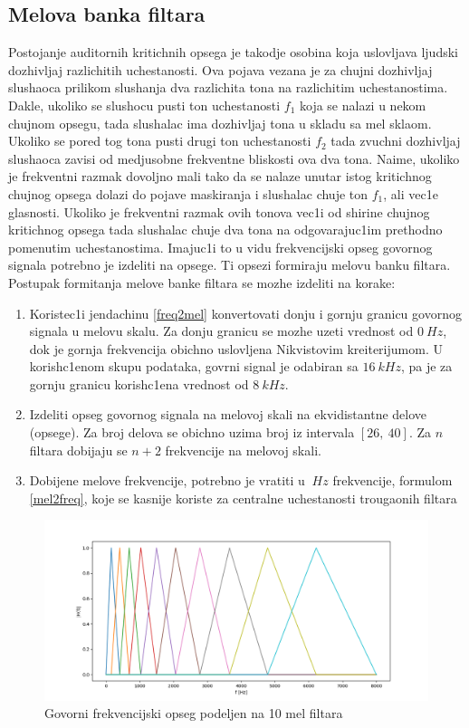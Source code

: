 \documentclass[a4paper, openany, oneside, 11pt]{book}
\begin{document}
\subsection{Melova banka filtara}
Postojanje auditornih kritichnih opsega je takodje osobina koja uslovljava ljudski dozhivljaj razlichitih uchestanosti. Ova pojava vezana je za chujni dozhivljaj slushaoca  prilikom slushanja dva razlichita tona na razlichitim uchestanostima. Dakle, ukoliko se slushocu pusti ton uchestanosti $f_1$ koja se nalazi u nekom chujnom opsegu, tada slushalac ima dozhivljaj tona u skladu sa mel sklaom. Ukoliko se pored tog tona pusti drugi ton uchestanosti $f_2$ tada zvuchni dozhivljaj slushaoca zavisi od medjusobne frekventne bliskosti ova dva tona. Naime, ukoliko je frekventni razmak dovoljno mali tako da se nalaze unutar istog kritichnog chujnog opsega dolazi do pojave maskiranja i slushalac chuje ton $f_1$, ali vec1e glasnosti. Ukoliko je frekventni razmak ovih tonova vec1i od shirine chujnog kritichnog opsega tada slushalac chuje dva tona na odgovarajuc1im prethodno pomenutim uchestanostima. Imajuc1i to u vidu frekvencijski opseg govornog signala potrebno je izdeliti na opsege. Ti opsezi formiraju melovu banku filtara. Postupak formitanja melove banke filtara se mozhe izdeliti na korake:
\begin{enumerate}
\item Koristec1i jendachinu \ref{freq2mel} konvertovati donju i gornju granicu govornog signala u melovu skalu. Za donju granicu se mozhe uzeti vrednost od $\SI{0}{Hz}$, dok je gornja frekvencija obichno uslovljena Nikvistovim kreiterijumom. U korish\-c1enom skupu podataka, govrni signal je odabiran sa $\SI{16}{kHz}$, pa je za gornju granicu korish\-c1ena vrednost od $\SI{8}{kHz}$.
\item Izdeliti opseg govornog signala na melovoj skali na ekvidistantne delove (opsege). Za broj delova se obichno uzima broj iz intervala $[26,\ 40]$. Za $n$ filtara dobijaju se $n+2$ frekvencije na melovoj skali.
\item Dobijene melove frekvencije, potrebno je vratiti u $\SI{}{Hz}$ frekvencije, formulom \ref{mel2freq}, koje se kasnije koriste za centralne uchestanosti trougaonih filtara
\end{enumerate}
\begin{figure}[h!]
\centering
  \includegraphics[scale=0.5]{res/10filterbank.png}
  \caption{Govorni frekvencijski opseg podeljen na 10 mel filtara}
  \label{fig:2}
  \vspace{0pt}
\end{figure}
\end{document}
